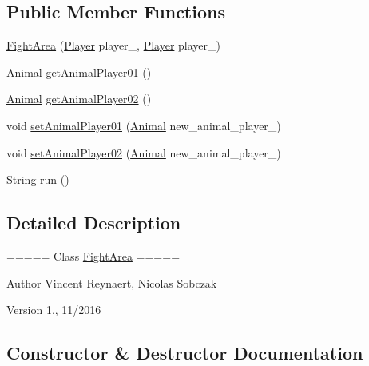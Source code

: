 \subsection*{Public Member Functions}
\begin{DoxyCompactItemize}
\item 
\hyperlink{classspace_pig_fighter_package_1_1_fight_area_a82eab1ab77303790870fa0a866ca8c0f}{Fight\+Area} (\hyperlink{classplayer_package_1_1_player}{Player} player\+\_, \hyperlink{classplayer_package_1_1_player}{Player} player\+\_)
\item 
\hyperlink{classanimal_package_1_1_animal}{Animal} \hyperlink{classspace_pig_fighter_package_1_1_fight_area_a6464a4f6d21ab6ebc940ac6286e4af46}{get\+Animal\+Player01} ()
\item 
\hyperlink{classanimal_package_1_1_animal}{Animal} \hyperlink{classspace_pig_fighter_package_1_1_fight_area_a6850916669ee6860d0ea713088e7d0cb}{get\+Animal\+Player02} ()
\item 
void \hyperlink{classspace_pig_fighter_package_1_1_fight_area_a3300b7e6808c05808e244e0bcb901dad}{set\+Animal\+Player01} (\hyperlink{classanimal_package_1_1_animal}{Animal} new\+\_\+animal\+\_\+player\+\_)
\item 
void \hyperlink{classspace_pig_fighter_package_1_1_fight_area_ae08c2c294e047a0eb19462baece03f17}{set\+Animal\+Player02} (\hyperlink{classanimal_package_1_1_animal}{Animal} new\+\_\+animal\+\_\+player\+\_)
\item 
String \hyperlink{classspace_pig_fighter_package_1_1_fight_area_a8572396ce29c01859157b72c581fc19c}{run} ()
\end{DoxyCompactItemize}


\subsection{Detailed Description}
===== Class \hyperlink{classspace_pig_fighter_package_1_1_fight_area}{Fight\+Area} =====

\begin{DoxyAuthor}{Author}
Vincent Reynaert, Nicolas Sobczak 
\end{DoxyAuthor}
\begin{DoxyVersion}{Version}
1., 11/2016 
\end{DoxyVersion}


\subsection{Constructor \& Destructor Documentation}
